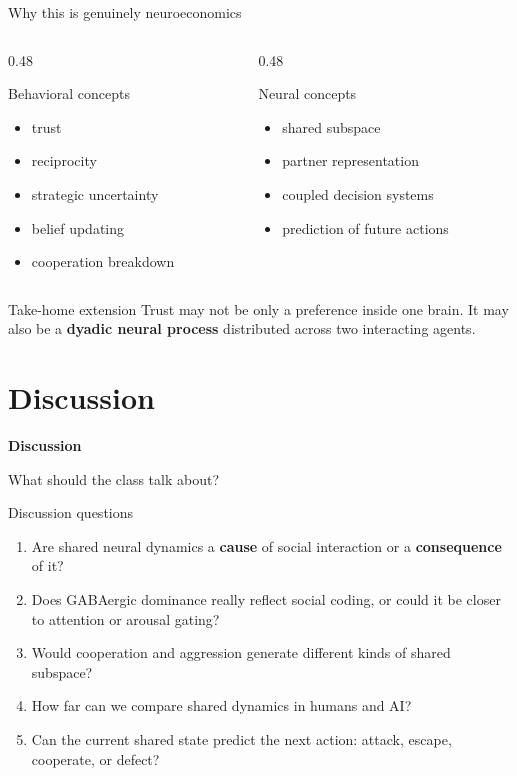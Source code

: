 \documentclass[aspectratio=169,11pt]{beamer}
\newcommand{\sectiondivider}[2]{
  \begin{frame}[plain]
    \vfill
    {\color{accentblue}\LARGE\bfseries #1\par}
    \vspace{0.5em}
    {\large #2\par}
    \vfill
  \end{frame}
}
\begin{document}
\begin{frame}{Why this is genuinely neuroeconomics}
\begin{columns}[T]
  \begin{column}{0.48\textwidth}
    \begin{block}{Behavioral concepts}
    \begin{itemize}
      \item trust
      \item reciprocity
      \item strategic uncertainty
      \item belief updating
      \item cooperation breakdown
    \end{itemize}
    \end{block}
  \end{column}
  \begin{column}{0.48\textwidth}
    \begin{block}{Neural concepts}
    \begin{itemize}
      \item shared subspace
      \item partner representation
      \item coupled decision systems
      \item prediction of future actions
    \end{itemize}
    \end{block}
  \end{column}
\end{columns}
\vspace{0.4em}
\begin{alertblock}{Take-home extension}
Trust may not be only a preference inside one brain. It may also be a \textbf{dyadic neural process} distributed across two interacting agents.
\end{alertblock}
\end{frame}

\section{Discussion}
\sectiondivider{Discussion}{What should the class talk about?}

\begin{frame}{Discussion questions}
\begin{enumerate}
  \item Are shared neural dynamics a \textbf{cause} of social interaction or a \textbf{consequence} of it?
  \item Does GABAergic dominance really reflect social coding, or could it be closer to attention or arousal gating?
  \item Would cooperation and aggression generate different kinds of shared subspace?
  \item How far can we compare shared dynamics in humans and AI?
  \item Can the current shared state predict the next action: attack, escape, cooperate, or defect?
\end{enumerate}
\end{frame}
\end{document}
